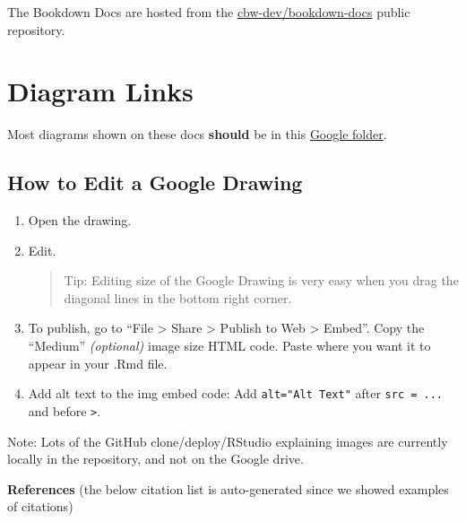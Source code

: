 \documentclass[
]{book}
\theoremstyle{definition}
\theoremstyle{definition}
\theoremstyle{definition}
\theoremstyle{definition}
\theoremstyle{remark}
\begin{document}
The Bookdown Docs are hosted from the \href{https://github.com/cbw-dev/bookdown-docs}{cbw-dev/bookdown-docs} public repository.

\section{Diagram Links}\label{diagram-links}

Most diagrams shown on these docs \textbf{should} be in this \href{https://drive.google.com/drive/folders/136sy6WIiSG3tBFVpHt8yQwLakB4TFJvn?usp=sharing}{Google folder}.

\subsection{How to Edit a Google Drawing}\label{how-to-edit-a-google-drawing}

\begin{enumerate}
\def\labelenumi{\arabic{enumi}.}
\item
  Open the drawing.
\item
  Edit.

  \begin{quote}
  Tip: Editing size of the Google Drawing is very easy when you drag the diagonal lines in the bottom right corner.
  \end{quote}
\item
  To publish, go to ``File \textgreater{} Share \textgreater{} Publish to Web \textgreater{} Embed''. Copy the ``Medium'' \emph{(optional)} image size HTML code. Paste where you want it to appear in your .Rmd file.
\item
  Add alt text to the img embed code: Add \texttt{alt="Alt\ Text"} after \texttt{src\ =\ ...} and before \texttt{\textgreater{}}.
\end{enumerate}

Note: Lots of the GitHub clone/deploy/RStudio explaining images are currently locally in the repository, and not on the Google drive.

\textbf{References} (the below citation list is auto-generated since we showed examples of citations)

  
\end{document}
